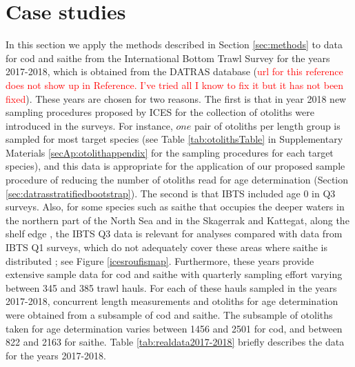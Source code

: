 \documentclass[a4paper 12pt]{article}
\numberwithin{equation}{section}
\newcommand{\ed}[1]{\textcolor{red}{#1}}
\begin{document}
\section{Case studies}
\label{sec:data}
In this section we apply the methods described in Section \ref{sec:methods} to data for cod and saithe from the International Bottom Trawl Survey for the years 2017-2018, which is obtained from the DATRAS database \citep{datras} (\ed{url  for this reference does not show up in Reference. I've tried all I know to fix it but it has not been fixed}). These years are chosen for two reasons. The first is that in year 2018 new sampling procedures proposed by ICES for the collection of otoliths were introduced in the surveys. For instance, $one$ pair of otoliths per length group is sampled for most target species (see Table \ref{tab:otolithsTable} in Supplementary Materials \ref{secAp:otolithappendix} for the sampling procedures for each target species), and this data is appropriate for the application of our proposed sample procedure of reducing the number of otoliths read for age determination (Section \ref{sec:datrasstratifiedbootstrap}). The second is that IBTS included age 0 in Q3 surveys. Also, for some species such as saithe that occupies the deeper waters in the northern part of the North Sea and in the Skagerrak and Kattegat, along the shelf edge \citep{ICESFishMaps}, the IBTS Q3 data is relevant for analyses compared with data from IBTS Q1 surveys, which do not adequately cover these areas where saithe is distributed \citep{ICESJune2016}; see Figure \ref{icesroufismap}. Furthermore, these years provide extensive sample data for cod and saithe with quarterly sampling effort varying between 345 and 385 trawl hauls. For each of these hauls sampled in the years 2017-2018, concurrent length measurements and otoliths for age determination were obtained from a subsample of cod and saithe. The subsample of otoliths taken for age determination varies between 1456 and 2501 for cod, and between 822 and 2163 for saithe. Table \ref{tab:realdata2017-2018} briefly describes the data for the years 2017-2018.\\
\end{document}
